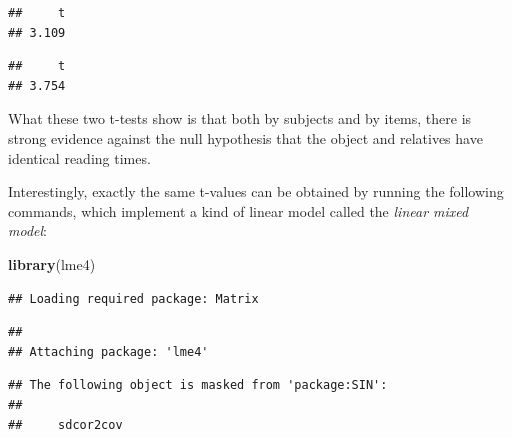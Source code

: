 \documentclass[12pt,]{krantz}
\newenvironment{Shaded}{\begin{snugshade}}{\end{snugshade}}
\newcommand{\DataTypeTok}[1]{\textcolor[rgb]{0.13,0.29,0.53}{#1}}
\newcommand{\DecValTok}[1]{\textcolor[rgb]{0.00,0.00,0.81}{#1}}
\newcommand{\KeywordTok}[1]{\textcolor[rgb]{0.13,0.29,0.53}{\textbf{#1}}}
\newcommand{\NormalTok}[1]{#1}
\newcommand{\OperatorTok}[1]{\textcolor[rgb]{0.81,0.36,0.00}{\textbf{#1}}}
\newcommand{\OtherTok}[1]{\textcolor[rgb]{0.56,0.35,0.01}{#1}}
\newcommand{\StringTok}[1]{\textcolor[rgb]{0.31,0.60,0.02}{#1}}
\begin{document}
\begin{verbatim}
##     t 
## 3.109
\end{verbatim}

\begin{Shaded}
\end{Shaded}

\begin{verbatim}
##     t 
## 3.754
\end{verbatim}

What these two t-tests show is that both by subjects and by items, there is strong evidence against the null hypothesis that the object and relatives have identical reading times.

Interestingly, exactly the same t-values can be obtained by running the following commands, which implement a kind of linear model called the \emph{linear mixed model}:

\begin{Shaded}
\begin{Highlighting}[]
\KeywordTok{library}\NormalTok{(lme4)}
\end{Highlighting}
\end{Shaded}

\begin{verbatim}
## Loading required package: Matrix
\end{verbatim}

\begin{verbatim}
## 
## Attaching package: 'lme4'
\end{verbatim}

\begin{verbatim}
## The following object is masked from 'package:SIN':
## 
##     sdcor2cov
\end{verbatim}

\begin{Shaded}
\end{Shaded}
\end{document}
